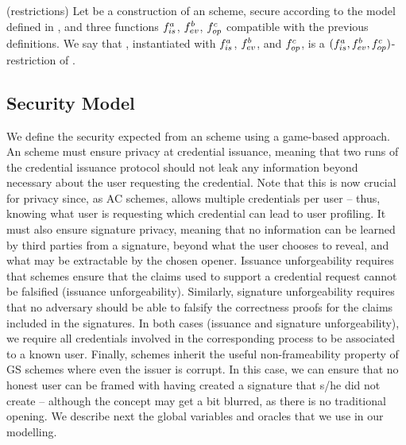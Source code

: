 \begin{definition}{(\CUASGen restrictions)}
  \label{def:uas-restrictions}
  Let \CUASGen be a construction of an \UAS scheme, secure according to
  the model defined in , and three functions $f_{is}^a$,
  $f_{ev}^b$, $f_{op}^c$ compatible with the previous definitions. We say that
  \CUASGen, instantiated with $f_{is}^a$, $f_{ev}^b$, and $f_{op}^c$, is a
  $(f_{is}^a,f_{ev}^b,f_{op}^c)$-restriction of \CUASGen.
\end{definition}



\subsection{Security Model}
\label{ssec:model-uas}

We define the security expected from an \UAS scheme using a game-based approach.
An \UAS scheme must ensure privacy at credential issuance, meaning that two
runs of the credential issuance protocol should not leak any information beyond
necessary about the user requesting the credential. Note that this is now
crucial for privacy since, as AC schemes, \UAS allows multiple credentials per
user -- thus, knowing what user is requesting which credential can lead to user
profiling. It must also ensure signature privacy, meaning that no information
can be learned by third parties from a signature, beyond what the user chooses
to reveal, and what may be extractable by the chosen opener. Issuance
unforgeability requires that \UAS schemes ensure that the claims used to support
a credential request cannot be falsified (issuance unforgeability). Similarly,
signature unforgeability requires that no adversary should be able to falsify
the correctness proofs for the claims included in the signatures. In both cases
(issuance and signature unforgeability), we require all credentials involved in
the corresponding process to be associated to a known user. Finally, \UAS
schemes inherit the useful non-frameability property of GS schemes where even
the issuer is corrupt. In this case, we can ensure that no honest user
can be framed with having created a signature that s/he did not create --
although the concept may get a bit blurred, as there is no traditional opening.
%
We describe next the global variables and oracles that we use in our modelling.

